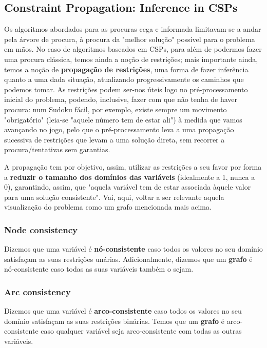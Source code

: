 \documentclass[11pt]{article}
\begin{document}
\subsection{Constraint Propagation: Inference in CSPs}

Os algoritmos abordados para as procuras cega e informada limitavam-se a andar pela árvore de procura, à procura da "melhor solução" possível para o problema em mãos. No caso de algoritmos baseados em CSPs, para além de podermos fazer uma procura clássica, temos ainda a noção de restrições; mais importante ainda, temos a noção de \textbf{propagação de restrições}, uma forma de fazer inferência quanto a uma dada situação, atualizando progressivamente os caminhos que podemos tomar. As restrições podem ser-nos úteis logo no pré-processamento inicial do problema, podendo, inclusive, fazer com que não tenha de haver procura: num Sudoku fácil, por exemplo, existe sempre um movimento "obrigatório" (leia-se "aquele número tem de estar ali") à medida que vamos avançando no jogo, pelo que o pré-processamento leva a uma propagação sucessiva de restrições que levam a uma solução direta, sem recorrer a procura/tentativas sem garantias.\vspace{4pt}

A propagação tem por objetivo, assim, utilizar as restrições a seu favor por forma a \textbf{reduzir o tamanho dos domínios das variáveis} (idealmente a 1, nunca a 0), garantindo, assim, que "aquela variável tem de estar associada àquele valor para uma solução consistente". Vai, aqui, voltar a ser relevante aquela visualização do problema como um grafo mencionada mais acima.

\subsubsection{Node consistency}

Dizemos que uma variável é \textbf{nó-consistente} caso todos os valores no seu domínio satisfaçam as suas restrições unárias. Adicionalmente, dizemos que um \textbf{grafo} é nó-consistente caso todas as suas variáveis também o sejam.

\subsubsection{Arc consistency}

Dizemos que uma variável é \textbf{arco-consistente} caso todos os valores no seu domínio satisfaçam as suas restrições binárias. Temos que um \textbf{grafo} é arco-consistente caso qualquer variável seja arco-consistente com todas as outras variáveis.\vspace{10pt}
\end{document}
